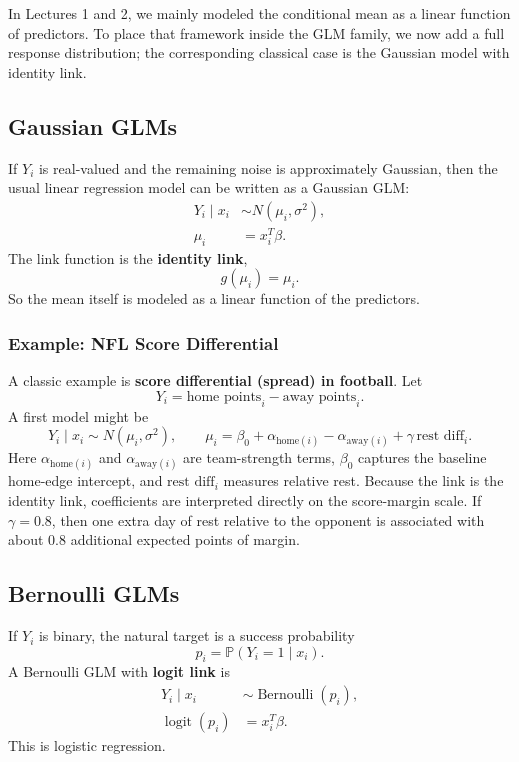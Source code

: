 \documentclass[twoside]{article}
\theoremstyle{definition}
\renewcommand{\P}{\mathbb{P}}
\newcommand{\logit}{\operatorname{logit}}
\begin{document}
In Lectures 1 and 2, we mainly modeled the conditional mean as a linear function of predictors. To place that framework inside the GLM family, we now add a full response distribution; the corresponding classical case is the Gaussian model with identity link.

\subsection{Gaussian GLMs}

If $Y_i$ is real-valued and the remaining noise is approximately Gaussian, then the usual linear regression model can be written as a Gaussian GLM:
\begin{align*}
    Y_i \mid x_i &\sim N(\mu_i, \sigma^2), \\
    \mu_i &= x_i^T\beta.
\end{align*}
The link function is the \textbf{identity link},
\[
    g(\mu_i) = \mu_i.
\]
So the mean itself is modeled as a linear function of the predictors.

\subsubsection*{Example: NFL Score Differential}

A classic example is \textbf{score differential (spread) in football}. Let
\[
    Y_i = \text{home points}_i - \text{away points}_i.
\]
A first model might be
\[
    Y_i \mid x_i \sim N(\mu_i, \sigma^2), \qquad
    \mu_i = \beta_0 + \alpha_{\text{home}(i)} - \alpha_{\text{away}(i)} + \gamma\,\text{rest diff}_i.
\]
Here $\alpha_{\text{home}(i)}$ and $\alpha_{\text{away}(i)}$ are team-strength terms, $\beta_0$ captures the baseline home-edge intercept, and $\text{rest diff}_i$ measures relative rest. Because the link is the identity link, coefficients are interpreted directly on the score-margin scale. If $\gamma = 0.8$, then one extra day of rest relative to the opponent is associated with about $0.8$ additional expected points of margin.

\subsection{Bernoulli GLMs}

If $Y_i$ is binary, the natural target is a success probability
\[
    p_i = \P(Y_i = 1 \mid x_i).
\]
A Bernoulli GLM with \textbf{logit link} is
\begin{align*}
    Y_i \mid x_i &\sim \operatorname{Bernoulli}(p_i), \\
    \logit(p_i) &= x_i^T\beta.
\end{align*}
This is logistic regression.
\end{document}

